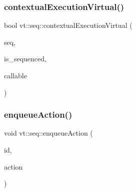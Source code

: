 \mbox{\label{namespacevt_1_1seq_ab924e025689b220c9a7876bfecb24741}} 
\subsubsection{\texorpdfstring{contextual\+Execution\+Virtual()}{contextualExecutionVirtual()}}
{\footnotesize\ttfamily bool vt\+::seq\+::contextual\+Execution\+Virtual (\begin{DoxyParamCaption}\item[{\hyperlink{namespacevt_1_1seq_a3b612da217ac669d39c159f134ab8434}{Seq\+Type} const \&}]{seq,  }\item[{bool const \&}]{is\+\_\+sequenced,  }\item[{\hyperlink{namespacevt_1_1seq_ab8c5e0c5aec2bd712a2b57e2e4553de6}{Seq\+Callable\+Type} \&\&}]{callable }\end{DoxyParamCaption})}

\mbox{\label{namespacevt_1_1seq_aaf4240d6148f7ce0e8f1c3bd31705685}} 
\subsubsection{\texorpdfstring{enqueue\+Action()}{enqueueAction()}}
{\footnotesize\ttfamily void vt\+::seq\+::enqueue\+Action (\begin{DoxyParamCaption}\item[{\hyperlink{namespacevt_1_1seq_a3b612da217ac669d39c159f134ab8434}{Seq\+Type} const \&}]{id,  }\item[{\hyperlink{namespacevt_ae0a5a7b18cc99d7b732cb4d44f46b0f3}{Action\+Type} const \&}]{action }\end{DoxyParamCaption})\hspace{0.3cm}{\ttfamily [inline]}}

\mbox{\label{namespacevt_1_1seq_abccaa18f7df5f19a80dcf62a489d3eb0}} 
